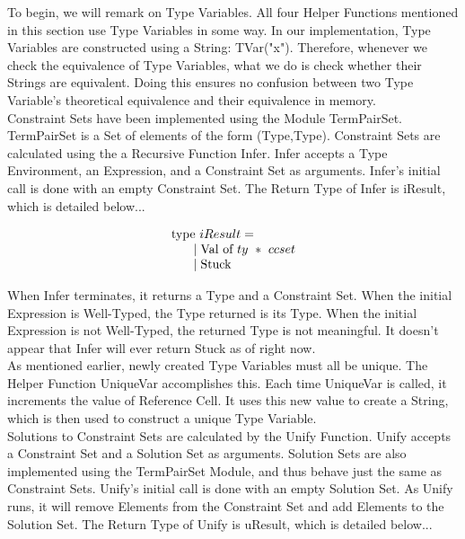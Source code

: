 \documentclass{article}
\begin{document}
To begin, we will remark on Type Variables. All four Helper Functions mentioned in this section use Type Variables in some way. In our implementation, Type Variables are constructed using a String: TVar("x"). Therefore, whenever we check the equivalence of Type Variables, what we do is check whether their Strings are equivalent. Doing this ensures no confusion between two Type Variable's theoretical equivalence and their equivalence in memory.\\

Constraint Sets have been implemented using the Module TermPairSet. TermPairSet is a Set of elements of the form (Type,Type). Constraint Sets are calculated using the a Recursive Function Infer. Infer accepts a Type Environment, an Expression, and a Constraint Set as arguments. Infer's initial call is done with an empty Constraint Set. The Return Type of Infer is iResult, which is detailed below...

\begin{equation}
    \begin{array}{l}
    \text{type} \ iResult = \\
    \indent \mid \text{Val of} \ ty \ * \ ccset \\
    \indent \mid \text{Stuck}
    \end{array}
\end{equation}

When Infer terminates, it returns a Type and a Constraint Set. When the initial Expression is Well-Typed, the Type returned is its Type. When the initial Expression is not Well-Typed, the returned Type is not meaningful. It doesn't appear that Infer will ever return Stuck as of right now.\\

As mentioned earlier, newly created Type Variables must all be unique. The Helper Function UniqueVar accomplishes this. Each time UniqueVar is called, it increments the value of Reference Cell. It uses this new value to create a String, which is then used to construct a unique Type Variable. \\

Solutions to Constraint Sets are calculated by the Unify Function. Unify accepts a Constraint Set and a Solution Set as arguments. Solution Sets are also implemented using the TermPairSet Module, and thus behave just the same as Constraint Sets. Unify's initial call is done with an empty Solution Set. As Unify runs, it will remove Elements from the Constraint Set and add Elements to the Solution Set. The Return Type of Unify is uResult, which is detailed below...
\end{document}
